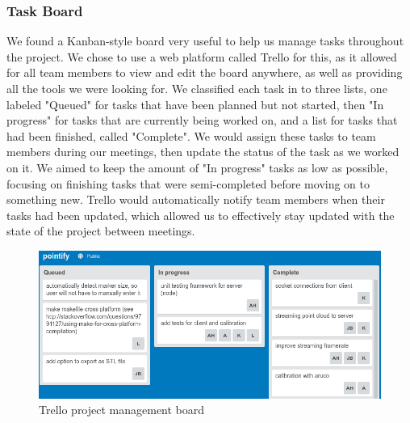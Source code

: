 \documentclass{article}
\begin{document}
\subsubsection{Task Board}
We found a Kanban-style board very useful to help us manage tasks throughout the project. We chose to use a web platform called Trello for this, as it allowed for all team members to view and edit the board anywhere, as well as providing all the tools we were looking for. We classified each task in to three lists, one labeled "Queued" for tasks that have been planned but not started, then "In progress" for tasks that are currently being worked on, and a list for tasks that had been finished, called "Complete". We would assign these tasks to team members during our meetings, then update the status of the task as we worked on it. We aimed to keep the amount of "In progress" tasks as low as possible, focusing on finishing tasks that were semi-completed before moving on to something new. Trello would automatically notify team members when their tasks had been updated, which allowed us to effectively stay updated with the state of the project between meetings. 
\begin{figure}[h]
  \centering
  \includegraphics[scale=0.5]{trello}
  \caption{Trello project management board}
  \label{fig:trello}
\end{figure}
\\
\end{document}
